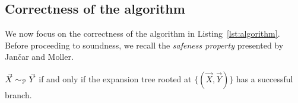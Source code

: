 







\subsection{Correctness of the algorithm}

We now focus on the correctness of the algorithm in
Listing~\ref{lst:algorithm}.  Before proceeding to soundness, we
recall the \emph{safeness property} presented by Jan{\v{c}}ar and
Moller.

\begin{proposition} 
  \label{prop:safeness}
  $\vec X \sim_\mathcal P \vec Y$ if and only if the expansion tree rooted
  at $\{(\vec X, \vec Y)\}$ has a successful branch.
\end{proposition}

